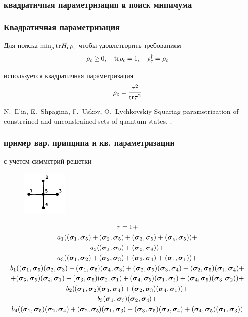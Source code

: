 \documentclass{beamer}
\begin{document}
\subsubsection{квадратичная параметризация и поиск минимума}
\begin{frame}
\frametitle{Квадратичная параметризация}
Для поиска $\min_\rho \tr H_c\rho_c$ чтобы удовлетворить требованиям 
$$\rho_c \geq 0,\quad \tr \rho_c=1, \quad \rho_c^\dagger=\rho_c$$ 

используется квадратичная параметризация 
$$\rho_c = \frac{\tau^2}{\tr \tau^2}$$

\footnotesize{
\begin{thebibliography}{99}
N.~Il'in, E.~Shpagina, F.~Uskov, O.~Lychkovskiy
\newblock Squaring parametrization of constrained and
  unconstrained sets of quantum states.
.
\end{thebibliography}
}

\end{frame}
\begin{frame}
\frametitle{пример вар. принципа и кв. параметризации}
с учетом симметрий решетки
\begin{figure}
\includegraphics[width=0.2\textwidth]{cluster-crest.png}
\end{figure}

\small
$$\begin{gathered}
\tau=1 + \\
a_1 ((\cc_1, \cc_5) + (\cc_2, \cc_5) + (\cc_3, \cc_5) + (\cc_4, \cc_5)) + \\
a_2 ((\cc_1, \cc_3) + (\cc_2, \cc_4)) + \\
a_3 ((\cc_1, \cc_2) + (\cc_2, \cc_3) + (\cc_3, \cc_4) + (\cc_4, \cc_1)) + \\
b_1 ((\cc_1, \cc_5) (\cc_2, \cc_3) + (\cc_1, \cc_5) (\cc_4, \cc_3) + (\cc_2, \cc_5) (\cc_3, \cc_4) + (\cc_2, \cc_5) (\cc_1, \cc_4) + \\
+ (\cc_3, \cc_5) (\cc_4, \cc_1) + (\cc_3, \cc_5) (\cc_2, \cc_1) + (\cc_4, \cc_5) (\cc_1, \cc_2) + (\cc_4, \cc_5) (\cc_3, \cc_2)) + \\
b_2 ((\cc_1, \cc_2) (\cc_3, \cc_4) + (\cc_2, \cc_3) (\cc_4, \cc_1)) + \\
b_3 (\cc_1, \cc_3) (\cc_2, \cc_4) + \\
b_4 ((\cc_1, \cc_5) (\cc_2, \cc_4) + (\cc_2, \cc_5) (\cc_1, \cc_3) + (\cc_3, \cc_5) (\cc_2, \cc_4) + (\cc_4, \cc_5) (\cc_1, \cc_3))
\end{gathered}$$

\normalsize
\end{frame}
\end{document}

